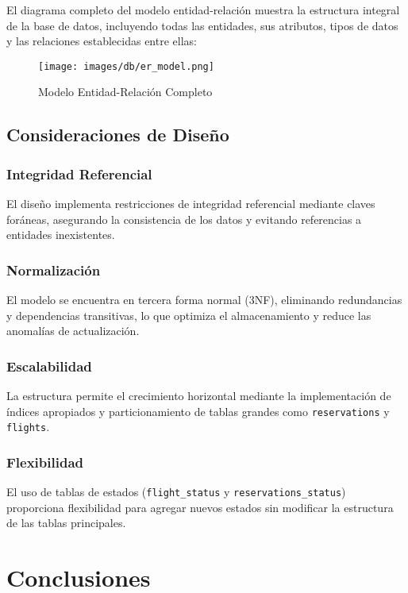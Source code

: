\documentclass[12pt,a4paper]{article}
\begin{document}
El diagrama completo del modelo entidad-relación muestra la estructura integral de la base de datos, incluyendo todas las entidades, sus atributos, tipos de datos y las relaciones establecidas entre ellas:

\begin{figure}[H]
    \centering
    \texttt{[image: images/db/er\_model.png]}
    \caption{Modelo Entidad-Relación Completo}
    \label{fig:modelo_er}
\end{figure}

\subsection{Consideraciones de Diseño}

\subsubsection{Integridad Referencial}
El diseño implementa restricciones de integridad referencial mediante claves foráneas, asegurando la consistencia de los datos y evitando referencias a entidades inexistentes.

\subsubsection{Normalización}
El modelo se encuentra en tercera forma normal (3NF), eliminando redundancias y dependencias transitivas, lo que optimiza el almacenamiento y reduce las anomalías de actualización.

\subsubsection{Escalabilidad}
La estructura permite el crecimiento horizontal mediante la implementación de índices apropiados y particionamiento de tablas grandes como \texttt{reservations} y \texttt{flights}.

\subsubsection{Flexibilidad}
El uso de tablas de estados (\texttt{flight\_status} y \texttt{reservations\_status}) proporciona flexibilidad para agregar nuevos estados sin modificar la estructura de las tablas principales.

\section{Conclusiones}
\end{document}
